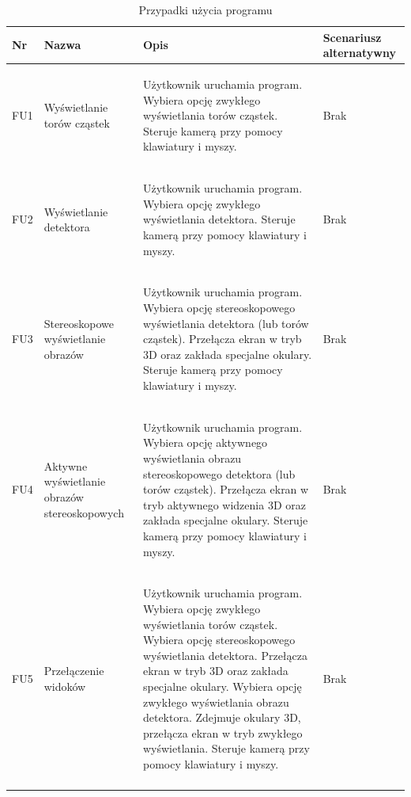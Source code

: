 \begin{table}[H]
\caption{Przypadki użycia programu}
\centering
\footnotesize
\label{tab4}
\begin{tabular}{!{\color{sapphire}\vrule width 1pt}m{0.05\textwidth}!{\color{black}\vrule width 1pt}m{0.16\textwidth}!{\color{black}\vrule width 1pt}m{0.50\textwidth}!{\color{black}\vrule width 1pt}m{0.17\textwidth}!{\color{sapphire}\vrule width 1pt}}
	\hline
	\Centering\bfseries Nr &
	\Centering\bfseries Nazwa &
	\Centering\bfseries Opis &
	\Centering\bfseries Scenariusz alternatywny \\
	\hline
	FU1 & Wyświetlanie torów cząstek & 
	\begin{itemize}
	\itemi Użytkownik uruchamia program.
	\itemi Wybiera opcję zwykłego wyświetlania torów cząstek.
	\itemi Steruje kamerą przy pomocy klawiatury i myszy.
	\end{itemize} & Brak \\ 
	\hline
	FU2 & Wyświetlanie detektora & \begin{itemize}
	\itemi Użytkownik uruchamia program.
	\itemi Wybiera opcję zwykłego wyświetlania detektora.
	\itemi Steruje kamerą przy pomocy klawiatury i myszy.
	\end{itemize} & Brak \\ 
	\hline
	FU3 & Stereoskopowe wyświetlanie obrazów & \begin{itemize}
	\itemi Użytkownik uruchamia program.
	\itemi Wybiera opcję stereoskopowego wyświetlania detektora (lub torów cząstek).
	\itemi Przełącza ekran w tryb 3D oraz zakłada specjalne okulary.
	\itemi Steruje kamerą przy pomocy klawiatury i myszy.
	\end{itemize} & Brak \\ 
	\hline
	FU4 & Aktywne wyświetlanie obrazów stereoskopowych & \begin{itemize}
	\itemi Użytkownik uruchamia program.
	\itemi Wybiera opcję aktywnego wyświetlania obrazu stereoskopowego detektora (lub torów cząstek).
	\itemi Przełącza ekran w tryb aktywnego widzenia 3D oraz zakłada specjalne okulary.
	\itemi Steruje kamerą przy pomocy klawiatury i myszy.
	\end{itemize} & Brak \\ 
	\hline
	FU5 & Przełączenie widoków & \begin{itemize}
	\itemi Użytkownik uruchamia program.
	\itemi Wybiera opcję zwykłego wyświetlania torów cząstek.
	\itemi Wybiera opcję stereoskopowego wyświetlania detektora.
	\itemi Przełącza ekran w tryb 3D oraz zakłada specjalne okulary.
	\itemi Wybiera opcję zwykłego wyświetlania obrazu detektora. 
	\itemi Zdejmuje okulary 3D, przełącza ekran w tryb zwykłego wyświetlania.
	\itemi Steruje kamerą przy pomocy klawiatury i myszy.
	\end{itemize} & Brak \\ 
	\hline
\end{tabular}
\end{table}

